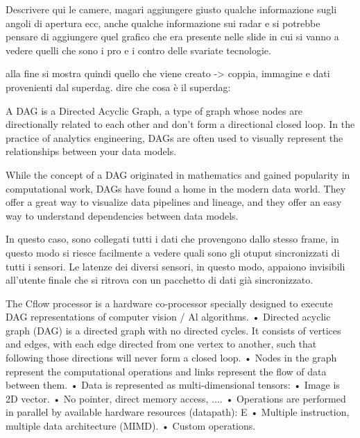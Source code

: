 Descrivere qui le camere, magari aggiungere giusto qualche informazione sugli angoli di apertura ecc, anche qualche informazione sui radar e si potrebbe pensare di aggiungere quel grafico che era presente nelle slide in cui si vanno a vedere quelli che sono i pro e i contro delle svariate tecnologie. 

alla fine si mostra quindi quello che viene creato -> coppia, immagine e dati provenienti dal superdag. 
dire che cosa è il superdag: 




A DAG is a Directed Acyclic Graph, a type of graph whose nodes are directionally related to each other and don’t form a directional closed loop. In the practice of analytics engineering, DAGs are often used to visually represent the relationships between your data models.

While the concept of a DAG originated in mathematics and gained popularity in computational work, DAGs have found a home in the modern data world. They offer a great way to visualize data pipelines and lineage, and they offer an easy way to understand dependencies between data models.

In questo caso, sono collegati tutti i dati che provengono dallo stesso frame, in questo modo si riesce facilmente a vedere quali sono gli otuput sincronizzati di tutti i sensori. Le latenze dei diversi sensori, in questo modo, appaiono invisibili all'utente finale che si ritrova con un pacchetto di dati già sincronizzato. 


The Cflow processor is a hardware co-processor specially designed to execute
DAG representations of computer vision / Al algorithms.
• Directed acyclic graph (DAG) is a directed graph with no directed cycles. It consists of vertices and edges, with each edge directed from one vertex to another, such that following those directions will never form a closed loop.
• Nodes in the graph represent the computational operations and links represent the flow of data between them.
• Data is represented as multi-dimensional tensors:
• Image is 2D vector.
• No pointer, direct memory access, ....
• Operations are performed in parallel by available hardware resources (datapath):
E
• Multiple instruction, multiple data architecture (MIMD).
• Custom operations.

